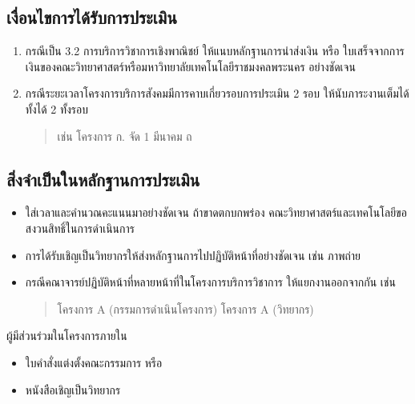 \documentclass[a4paper,12pt,english]{sphinxmanual}
\begin{document}
\subsection{เงื่อนไขการได้รับการประเมิน}
\label{\detokenize{workload_rubric:id53}}\begin{enumerate}
%
\item {} 
กรณีเป็น 3.2 การบริการวิชาการเชิงพาณิชย์ ให้แนบหลักฐานการนำส่งเงิน หรือ ใบเสร็จจากการเงินของคณะวิทยาศาสตร์หรือมหาวิทยาลัยเทคโนโลยีราชมงคลพระนคร อย่างชัดเจน

\item {} 
กรณีระยะเวลาโครงการบริการสังคมมีการคาบเกี่ยวรอบการประเมิน 2 รอบ ให้นับภาระงานเต็มได้ทั้งได้ 2 ทั้งรอบ
\begin{quote}

เช่น โครงการ ก. จัด 1 มีนาคม ถ
\end{quote}

\end{enumerate}


\subsection{สิ่งจำเป็นในหลักฐานการประเมิน}
\label{\detokenize{workload_rubric:id54}}\begin{itemize}
\item {} 
 ใส่เวลาและคำนวณคะแนนมาอย่างชัดเจน ถ้าขาดตกบกพร่อง คณะวิทยาศาสตร์และเทคโนโลยีขอสงวนสิทธิ์ในการดำเนินการ

\item {} 
การได้รับเชิญเป็นวิทยากรให้ส่งหลักฐานการไปปฏิบัติหน้าที่อย่างชัดเจน เช่น ภาพถ่าย

\item {} 
กรณีคณาจารย์ปฏิบัติหน้าที่หลายหน้าที่ในโครงการบริการวิชาการ ให้แยกงานออกจากกัน เช่น
\begin{quote}

โครงการ A (กรรมการดำเนินโครงการ)
โครงการ A (วิทยากร)
\end{quote}

\end{itemize}

ผู้มีส่วนร่วมในโครงการภายใน
\begin{itemize}
\item {} 
ใบคำสั่งแต่งตั้งคณะกรรมการ หรือ

\item {} 
หนังสือเชิญเป็นวิทยากร

\end{itemize}
\end{document}
